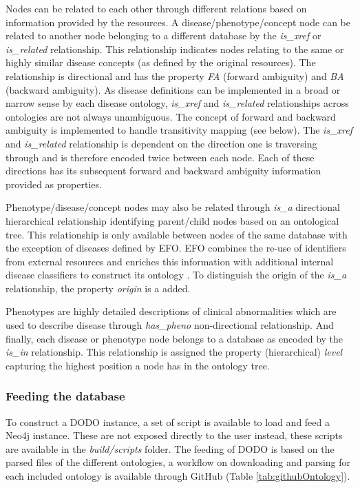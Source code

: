\documentclass[9pt,a4paper,]{extarticle}
\begin{document}
Nodes can be related to each other through different relations based on information provided by the
resources. A disease/phenotype/concept node can be related to another node belonging to a different database by the \emph{is\_xref} or \emph{is\_related} relationship. This relationship indicates nodes relating to the same or highly similar disease concepts (as defined by the original resources). The relationship is directional and has the property \emph{FA} (forward ambiguity) and \emph{BA} (backward ambiguity). As disease definitions can be implemented in a broad or narrow sense by each disease ontology, \emph{is\_xref} and \emph{is\_related} relationships across ontologies are not always unambiguous. The concept of forward and backward ambiguity is implemented to handle transitivity mapping (see below). The \emph{is\_xref} and \emph{is\_related} relationship is dependent on the direction one is traversing through and is therefore encoded twice between each node. Each of these directions has its subsequent forward and backward ambiguity information provided as properties.

Phenotype/disease/concept nodes may also be related through \emph{is\_a} directional hierarchical relationship identifying parent/child nodes based on an ontological tree. This relationship is only available between nodes of the same database with the exception of diseases defined by EFO. EFO combines the re-use of identifiers from external resources and enriches this information with additional internal disease classifiers to construct its ontology \citep{Malone2010}. To distinguish the origin of the \emph{is\_a} relationship, the property \emph{origin} is a added.

Phenotypes are highly detailed descriptions of clinical abnormalities which are used to describe disease through \emph{has\_pheno} non-directional relationship. And finally, each disease or phenotype node belongs to a database as encoded by the \emph{is\_in} relationship. This relationship is assigned the property (hierarchical) \emph{level} capturing the highest position a node has in the ontology tree.

\hypertarget{feeding-the-database}{%
\subsubsection{Feeding the database}\label{feeding-the-database}}

To construct a DODO instance, a set of script is available to load and feed a Neo4j instance. These are not exposed directly to the user instead, these scripts are available in the \emph{build/scripts} folder. The feeding of DODO is based on the parsed files of the different ontologies, a workflow on downloading and parsing for each included ontology is available through GitHub (Table \ref{tab:githubOntology}).
\end{document}
